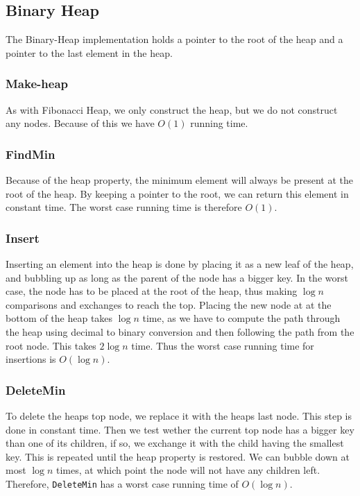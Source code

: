 \documentclass[a4paper,10pt]{article}
\begin{document}
\subsection{Binary Heap}
The Binary-Heap implementation holds a pointer to the root of the heap and a pointer to the last element in the heap.
\subsubsection*{Make-heap}
As with Fibonacci Heap, we only construct the heap, but we do not construct any nodes. Because of this we have $O(1)$ running time.

\subsubsection*{FindMin}
Because of the heap property, the minimum element will always be present at the root of the heap. By keeping a pointer to the root, we can return this element in constant time. The worst case running time is therefore $O(1)$.

\subsubsection*{Insert}
Inserting an element into the heap is done by placing it as a new leaf of the heap, and bubbling up as long as the parent of the node has a bigger key. In the worst case, the node has to be placed at the root of the heap, thus making $\log n$ comparisons and exchanges to reach the top.
Placing the new node at at the bottom of the heap takes $\log n$ time, as we have to compute the path through the heap using decimal to binary conversion and then following the path from the root node. This takes $2\log n$ time. Thus the worst case running time for insertions is $O(\log n)$.

\subsubsection*{DeleteMin}
To delete the heaps top node, we replace it with the heaps last node. This step is done in constant time. Then we test wether the current top node has a bigger key than one of its children, if so, we exchange it with the child having the smallest key. This is repeated until the heap property is restored. We can bubble down at most $\log n$ times, at which point the node will not have any children left.
Therefore, \texttt{DeleteMin} has a worst case running time of $O(\log n)$.
\end{document}
